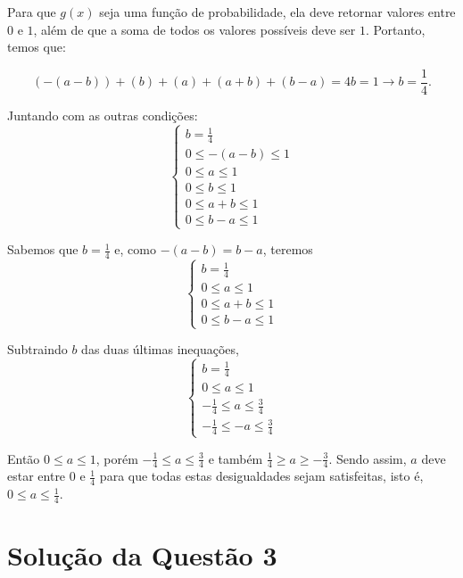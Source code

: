\documentclass[
	12pt,				%
	openright,			%
	oneside,			%
	a4paper,			%
	english,			%
	brazil,				%
	]{abntex2}
\begin{document}
Para que $g(x)$ seja uma função de probabilidade, ela deve retornar valores entre $0$ e $1$, além de que a soma de todos os valores possíveis deve ser $1$.
Portanto, temos que:

$$(-(a - b)) + (b) + (a) + (a + b) + (b - a) = 4b = 1 \to b = \frac{1}{4}.$$

Juntando com as outras condições:
\[
\begin{cases}
    b = \frac{1}{4}\\
    0 \leq -(a - b) \leq 1\\
    0 \leq a \leq 1\\
    0 \leq b \leq 1\\
    0 \leq a + b \leq 1\\
    0 \leq b - a \leq 1
\end{cases}
\]

Sabemos que $b = \frac{1}{4}$ e, como $-(a-b) = b - a$, teremos
\[
\begin{cases}
    b = \frac{1}{4}\\
    0 \leq a \leq 1\\
    0 \leq a + b \leq 1\\
    0 \leq b - a \leq 1
\end{cases}
\]

Subtraindo $b$ das duas últimas inequações,
\[
\begin{cases}
    b = \frac{1}{4}\\
    0 \leq a \leq 1\\
    -\frac{1}{4} \leq a \leq \frac{3}{4}\\
    -\frac{1}{4} \leq - a \leq \frac{3}{4}
\end{cases}
\]

Então $0 \leq a \leq 1$, porém $-\frac{1}{4} \leq a \leq \frac{3}{4}$ e também $\frac{1}{4} \geq a \geq -\frac{3}{4}$. Sendo assim, $a$ deve estar entre $0$ e $\frac{1}{4}$ para que todas estas desigualdades sejam satisfeitas, isto é, $0 \leq a \leq \frac{1}{4}$.


\section{Solução da Questão 3}
\end{document}
